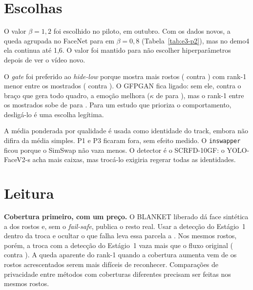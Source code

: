 \section{Escolhas}

O valor $\beta = 1{,}2$ foi escolhido no piloto, em outubro. Com os dados novos, a queda agrupada no FaceNet para em $\beta = 0{,}8$ (Tabela~\ref{tab:e3-p2}), mas no demo4 ela continua até 1,6. O valor foi mantido para não escolher hiperparâmetros depois de ver o vídeo novo.

O \emph{gate} foi preferido ao \emph{hide-low} porque mostra mais rostos ( contra ) com rank-1 menor entre os mostrados ( contra ). O GFPGAN fica ligado: sem ele, contra o braço que gera todo quadro, a emoção melhora ($\kappa$ de  para ), mas o rank-1 entre os mostrados sobe de  para . Para um estudo que prioriza o comportamento, desligá-lo é uma escolha legítima.

A média ponderada por qualidade é usada como identidade do track, embora não difira da média simples. P1 e P3 ficaram fora, sem efeito medido. O \texttt{inswapper} ficou porque o SimSwap não vaza menos. O detector é o SCRFD-10GF: o YOLO-FaceV2-s acha mais caixas, mas trocá-lo exigiria regerar todas as identidades.

\section{Leitura}

\textbf{Cobertura primeiro, com um preço.} O BLANKET liberado dá face sintética a  dos rostos e, sem o \emph{fail-safe}, publica o resto real. Usar a detecção do Estágio~1 dentro da troca e ocultar o que falha leva essa parcela a . Nos mesmos rostos, porém, a troca com a detecção do Estágio~1 vaza mais que o fluxo original ( contra ). A queda aparente do rank-1 quando a cobertura aumenta vem de os rostos acrescentados serem mais difíceis de reconhecer. Comparações de privacidade entre métodos com coberturas diferentes precisam ser feitas nos mesmos rostos.

